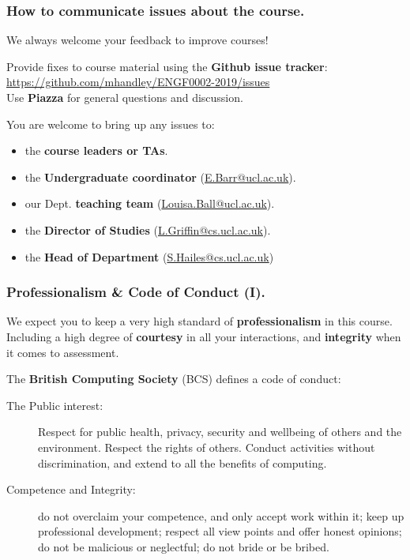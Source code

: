 \documentclass{beamer} %
\newcommand\emc[1]{\textcolor{midred}{\textbf{#1}}}
\begin{document}
\begin{frame}
\frametitle{How to communicate issues about the course.}

We always welcome your feedback to improve courses!

\vspace{3mm}
Provide fixes to course material using the \emc{Github issue tracker}:\\
\url{https://github.com/mhandley/ENGF0002-2019/issues}\\
Use \emc{Piazza} for general questions and discussion.

\vspace{3mm}
You are welcome to bring up any issues to:
\begin{itemize}
	\item the \emc{course leaders or TAs}.
	\item the \emc{Undergraduate coordinator} (\url{E.Barr@ucl.ac.uk}).
	\item our Dept. \emc{teaching team} (\url{Louisa.Ball@ucl.ac.uk}).
	\item the \emc{Director of Studies} (\url{L.Griffin@cs.ucl.ac.uk}).
	\item the \emc{Head of Department} (\url{S.Hailes@cs.ucl.ac.uk})
\end{itemize}

\end{frame}

\begin{frame}
\frametitle{Professionalism \& Code of Conduct (I).}

We expect you to keep a very high standard of \emc{professionalism} in this course. Including a high degree of \emc{courtesy} in all your interactions, and \emc{integrity} when it comes to assessment.

\vspace{3mm}
The \emc{British Computing Society} (BCS) defines a code of conduct:
\begin{description}
	\item[The Public interest:] Respect for public health, privacy, security and wellbeing of others and the environment. Respect the rights of others. Conduct activities without discrimination, and extend to all the benefits of computing.
	\item[Competence and Integrity:] do not overclaim your competence, and only accept work within it; keep up professional development; respect all view points and offer honest opinions; do not be malicious or neglectful; do not bride or be bribed.
\end{description}

\end{frame}
\end{document}
